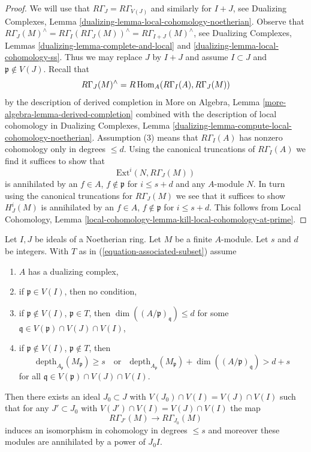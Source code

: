 \begin{proof}
We will use that $R\Gamma_J = R\Gamma_{V(J)}$ and similarly for
$I + J$, see
Dualizing Complexes, Lemma \ref{dualizing-lemma-local-cohomology-noetherian}.
Observe that
$R\Gamma_J(M)^\wedge = R\Gamma_I(R\Gamma_J(M))^\wedge =
R\Gamma_{I + J}(M)^\wedge$, see
Dualizing Complexes, Lemmas
\ref{dualizing-lemma-complete-and-local} and
\ref{dualizing-lemma-local-cohomology-ss}.
Thus we may replace $J$ by $I + J$ and assume $I \subset J$
and $\mathfrak p \not \in V(J)$.
Recall that
$$
R\Gamma_J(M)^\wedge = R\mathop{\mathrm{Hom}}\nolimits_A(R\Gamma_I(A), R\Gamma_J(M))
$$
by the description of derived completion in
More on Algebra, Lemma \ref{more-algebra-lemma-derived-completion}
combined with the description of local cohomology in
Dualizing Complexes, Lemma
\ref{dualizing-lemma-compute-local-cohomology-noetherian}.
Assumption (3) means that $R\Gamma_I(A)$ has nonzero cohomology
only in degrees $\leq d$. Using the canonical truncations of
$R\Gamma_I(A)$ we find it suffices to show that
$$
\text{Ext}^i(N, R\Gamma_J(M))
$$
is annihilated by an $f \in A$, $f \not \in \mathfrak p$ for
$i \leq s + d$ and any $A$-module $N$.
In turn using the canonical truncations for $R\Gamma_J(M)$
we see that it suffices to show
$H^i_J(M)$ is annihilated by an $f \in A$, $f \not \in \mathfrak p$
for $i \leq s + d$.
This follows from Local Cohomology, Lemma
\ref{local-cohomology-lemma-kill-local-cohomology-at-prime}.
\end{proof}

\begin{lemma}
\label{lemma-kill-colimit-weak-general}
Let $I, J$ be ideals of a Noetherian ring. Let $M$ be a finite $A$-module.
Let $s$ and $d$ be integers. With $T$ as in
(\ref{equation-associated-subset}) assume
\begin{enumerate}
\item $A$ has a dualizing complex,
\item if $\mathfrak p \in V(I)$, then no condition,
\item if $\mathfrak p \not \in V(I)$, $\mathfrak p \in T$, then
$\dim((A/\mathfrak p)_\mathfrak q) \leq d$ for some
$\mathfrak q \in V(\mathfrak p) \cap V(J) \cap V(I)$,
\item if $\mathfrak p \not \in V(I)$, $\mathfrak p \not \in T$, then
$$
\text{depth}_{A_\mathfrak p}(M_\mathfrak p) \geq s
\quad\text{or}\quad
\text{depth}_{A_\mathfrak p}(M_\mathfrak p) +
\dim((A/\mathfrak p)_\mathfrak q) > d + s
$$
for all $\mathfrak q \in V(\mathfrak p) \cap V(J) \cap V(I)$.
\end{enumerate}
Then there exists an ideal $J_0 \subset J$ with
$V(J_0) \cap V(I) = V(J) \cap V(I)$ such that for any $J' \subset J_0$ with
$V(J') \cap V(I) = V(J) \cap V(I)$ the map
$$
R\Gamma_{J'}(M) \longrightarrow R\Gamma_{J_0}(M)
$$
induces an isomorphism in cohomology in degrees $\leq s$
and moreover these modules are annihilated by a power of $J_0I$.
\end{lemma}

